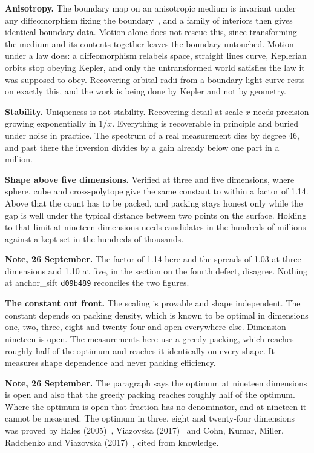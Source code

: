 \textbf{Anisotropy.} The boundary map on an anisotropic medium is invariant under any diffeomorphism fixing the boundary~\cite{src:Lee-and-Uhlmann-1989}, and a family of interiors then gives identical boundary data. Motion alone does not rescue this, since transforming the medium and its contents together leaves the boundary untouched. Motion under a law does: a diffeomorphism relabels space, straight lines curve, Keplerian orbits stop obeying Kepler, and only the untransformed world satisfies the law it was supposed to obey. Recovering orbital radii from a boundary light curve rests on exactly this, and the work is being done by Kepler and not by geometry.

\textbf{Stability.} Uniqueness is not stability. Recovering detail at scale $x$ needs precision growing exponentially in $1/x$. Everything is recoverable in principle and buried under noise in practice. The spectrum of a real measurement dies by degree 46, and past there the inversion divides by a gain already below one part in a million.

\textbf{Shape above five dimensions.} Verified at three and five dimensions, where sphere, cube and cross-polytope give the same constant to within a factor of 1.14. Above that the count has to be packed, and packing stays honest only while the gap is well under the typical distance between two points on the surface. Holding to that limit at nineteen dimensions needs candidates in the hundreds of millions against a kept set in the hundreds of thousands.

\textbf{Note, 26 September.} The factor of 1.14 here and the spreads of 1.03 at three dimensions and 1.10 at five, in the section on the fourth defect, disagree. Nothing at anchor\_sift \texttt{d09b489} reconciles the two figures.

\textbf{The constant out front.} The scaling is provable and shape independent. The constant depends on packing density, which is known to be optimal in dimensions one, two, three, eight and twenty-four and open everywhere else. Dimension nineteen is open. The measurements here use a greedy packing, which reaches roughly half of the optimum and reaches it identically on every shape. It measures shape dependence and never packing efficiency.

\textbf{Note, 26 September.} The paragraph says the optimum at nineteen dimensions is open and also that the greedy packing reaches roughly half of the optimum. Where the optimum is open that fraction has no denominator, and at nineteen it cannot be measured. The optimum in three, eight and twenty-four dimensions was proved by Hales (2005)~\cite{src:Hales-2005}, Viazovska (2017)~\cite{src:Viazovska-2017} and Cohn, Kumar, Miller, Radchenko and Viazovska (2017)~\cite{src:Cohn-Kumar-Miller-Radchenko-and-Viazovska-2017}, cited from knowledge.

